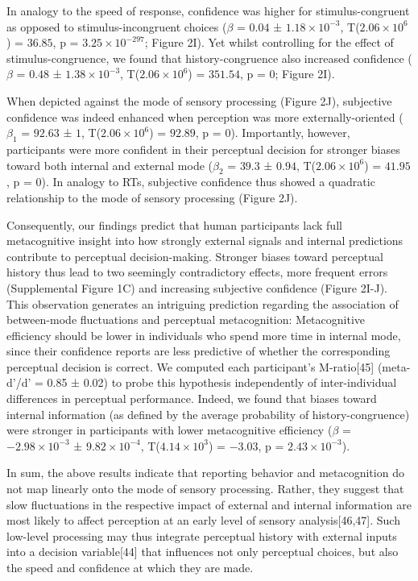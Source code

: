 \documentclass[
]{article}
\begin{document}
In analogy to the speed of response, confidence was higher for
stimulus-congruent as opposed to stimulus-incongruent choices (\(\beta\)
= \(0.04\) ± \(\ensuremath{1.18\times 10^{-3}}\),
T(\(\ensuremath{2.06\times 10^{6}}\)) = \(36.85\), p =
\(\ensuremath{3.25\times 10^{-297}}\); Figure 2I). Yet whilst
controlling for the effect of stimulus-congruence, we found that
history-congruence also increased confidence (\(\beta\) = \(0.48\) ±
\(\ensuremath{1.38\times 10^{-3}}\),
T(\(\ensuremath{2.06\times 10^{6}}\)) = \(351.54\), p = \(0\); Figure
2I).

When depicted against the mode of sensory processing (Figure 2J),
subjective confidence was indeed enhanced when perception was more
externally-oriented (\(\beta_1\) = \(92.63\) ± \(1\),
T(\(\ensuremath{2.06\times 10^{6}}\)) = \(92.89\), p = \(0\)).
Importantly, however, participants were more confident in their
perceptual decision for stronger biases toward both internal and
external mode (\(\beta_2\) = \(39.3\) ± \(0.94\),
T(\(\ensuremath{2.06\times 10^{6}}\)) = \(41.95\), p = \(0\)). In
analogy to RTs, subjective confidence thus showed a quadratic
relationship to the mode of sensory processing (Figure 2J).

Consequently, our findings predict that human participants lack full
metacognitive insight into how strongly external signals and internal
predictions contribute to perceptual decision-making. Stronger biases
toward perceptual history thus lead to two seemingly contradictory
effects, more frequent errors (Supplemental Figure 1C) and increasing
subjective confidence (Figure 2I-J). This observation generates an
intriguing prediction regarding the association of between-mode
fluctuations and perceptual metacognition: Metacognitive efficiency
should be lower in individuals who spend more time in internal mode,
since their confidence reports are less predictive of whether the
corresponding perceptual decision is correct. We computed each
participant's M-ratio{[}45{]} (meta-d'/d' = 0.85 ± 0.02) to probe this
hypothesis independently of inter-individual differences in perceptual
performance. Indeed, we found that biases toward internal information
(as defined by the average probability of history-congruence) were
stronger in participants with lower metacognitive efficiency (\(\beta\)
= \(\ensuremath{-2.98\times 10^{-3}}\) ±
\(\ensuremath{9.82\times 10^{-4}}\),
T(\(\ensuremath{4.14\times 10^{3}}\)) = \(-3.03\), p =
\(\ensuremath{2.43\times 10^{-3}}\)).

In sum, the above results indicate that reporting behavior and
metacognition do not map linearly onto the mode of sensory processing.
Rather, they suggest that slow fluctuations in the respective impact of
external and internal information are most likely to affect perception
at an early level of sensory analysis{[}46,47{]}. Such low-level
processing may thus integrate perceptual history with external inputs
into a decision variable{[}44{]} that influences not only perceptual
choices, but also the speed and confidence at which they are made.
\end{document}

